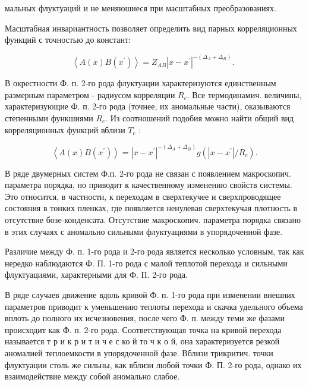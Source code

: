 \documentclass[10pt]{article}
\begin{document}
мальных флуктуаций и не меняюшиеся при масштабных преобразованиях.



Масштабная инвариантность позволяет определить вид парных корреляционных функций с точностью до констант:



\[

\left\langle A(x) B\left(x^{\prime}\right)\right\rangle=Z_{A B}\left|x-x^{\prime}\right|^{-\left(\Delta_{A}+\Delta_{B}\right)} \text {. }

\]



В окрестности Ф. п. 2-го рода флуктуации характеризуются единственным размерным параметром - радиусом корреляции $R_{c}$. Все термодинамич. величины, характеризующие Ф. п. 2-го рода (точнее, их аномальные части), оказываются степенными функшиями $R_{c}$. Из соотношений подобия можно найти общий вид корреляционных функций вблизи $T_{c}$ :



\[

\left\langle A(x) B\left(x^{\prime}\right)\right\rangle=\left|x-x^{\prime}\right|^{-\left(\Delta_{A}+\Delta_{B}\right)} g\left(\left|x-x^{\prime}\right| / R_{c}\right) .

\]



В ряде двумерных систем Ф.п. 2-го рода не связан с появлением макроскопич. параметра порядка, но приводит к качественному изменению свойств системы. Это относится, в частности, к переходам в сверхтекучее и сверхпроводящее состояния в тонких пленках, где появляется ненулевая сверхтекучая плотность в отсутствие бозе-конденсата. Отсутствие макроскопич. параметра порядка связано в этих случаях с аномально сильными флуктуациями в упорядоченной фазе.



Различие между Ф. п. 1-го рода и 2-го рода является несколько условным, так как нередко наблюдаются Ф. П. 1-го рода с малой теплотой перехода и сильными флуктуациями, характерными для Ф. П. 2-го рода.



В ряде случаев движение вдоль кривой Ф. п. 1-го рода при изменении внешних параметров приводит к уменьшению теплоты перехода и скачка удельного объема вплоть до полного их исчезновения, после чего Ф. п. между теми же фазами происходит как Ф. п. 2-го рода. Соответствующая точка на кривой перехода называется т р и к р и т и ч е с ко й то ч к о й, она характеризуется резкой аномалией теплоемкости в упорядоченной фазе. Вблизи трикритич. точки флуктуации столь же сильны, как вблизи любой точки Ф. П. 2-го рода, однако их взаимодействие между собой аномально слабое.
\end{document}
